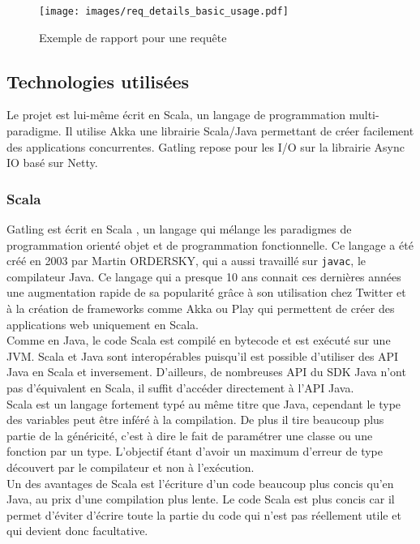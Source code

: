 \begin{figure}
 \centering
 \texttt{[image: images/req\_details\_basic\_usage.pdf]}
 \caption{Exemple de rapport pour une requête}
\end{figure}

\subsection{Technologies utilisées}

Le projet est lui-même écrit en Scala, un langage de programmation multi-paradigme. Il utilise Akka une librairie Scala/Java permettant de créer facilement des applications concurrentes. Gatling repose pour les I/O sur la librairie Async IO basé sur Netty.

\subsubsection{Scala}

Gatling est écrit en Scala \cite{scala}, un langage qui mélange les paradigmes de programmation orienté objet et de programmation fonctionnelle. Ce langage a été créé en 2003 par Martin ORDERSKY, qui a aussi travaillé sur \verb+javac+, le compilateur Java. Ce langage qui a presque 10 ans connait ces dernières années une augmentation rapide de sa popularité grâce à son utilisation chez Twitter et à la création de frameworks comme Akka ou Play \cite{play} qui permettent de créer des applications web uniquement en Scala.\\

Comme en Java, le code Scala est compilé en bytecode et est exécuté sur une JVM. Scala et Java sont interopérables puisqu'il est possible d'utiliser des API Java en Scala et inversement. D'ailleurs, de nombreuses API du SDK Java n'ont pas d'équivalent en Scala, il suffit d'accéder directement à l'API Java.\\

Scala est un langage fortement typé au même titre que Java, cependant le type des variables peut être inféré à la compilation. De plus il tire beaucoup plus partie de la généricité, c'est à dire le fait de paramétrer une classe ou une fonction par un type. L'objectif étant d'avoir un maximum d'erreur de type découvert par le compilateur et non à l'exécution.\\

Un des avantages de Scala est l'écriture d'un code beaucoup plus concis qu'en Java, au prix d'une compilation plus lente. Le code Scala est plus concis car il permet d'éviter d'écrire toute la partie du code qui n'est pas réellement utile et qui devient donc facultative.\\

